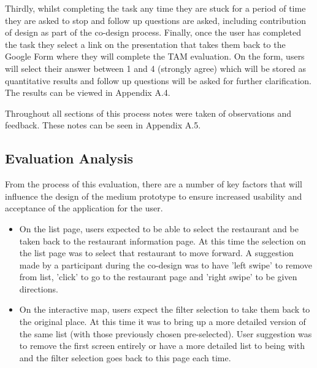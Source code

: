 \documentclass[a4 paper, 12pt]{article}
\begin{document}
Thirdly, whilst completing the task any time they are stuck for a period of time they are asked to stop and follow up questions are asked, including contribution of design as part of the co-design process. Finally, once the user has completed the task they select a link on the presentation that takes them back to the Google Form where they will complete the TAM evaluation. On the form, users will select their answer between 1 and 4 (strongly agree) which will be stored as quantitative results and follow up questions will be asked for further clarification. The results can be viewed in Appendix A.4.

Throughout all sections of this process notes were taken of observations and feedback. These notes can be seen in Appendix A.5.

\subsection{Evaluation Analysis}
From the process of this evaluation, there are a number of key factors that will influence the design of the medium prototype to ensure increased usability and acceptance of the application for the user.
\begin{itemize}
    \item On the list page, users expected to be able to select the restaurant and be taken back to the restaurant information page. At this time the selection on the list page was to select that restaurant to move forward. A suggestion made by a participant during the co-design was to have 'left swipe' to remove from list, 'click' to go to the restaurant page and 'right swipe' to be given directions.
    \item On the interactive map, users expect the filter selection to take them back to the original place. At this time it was to bring up a more detailed version of the same list (with those previously chosen pre-selected). User suggestion was to remove the first screen entirely or have a more detailed list to being with and the filter selection goes back to this page each time.
\end{itemize}
\end{document}
